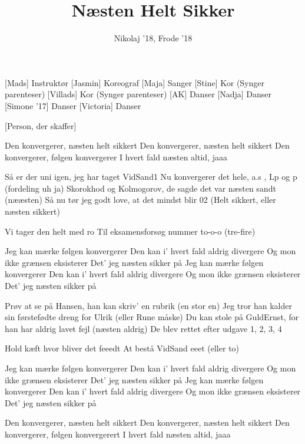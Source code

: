 \documentclass[a4paper,11pt]{article}
\title{Næsten Helt Sikker}
\author{Nikolaj '18, Frode '18}
\begin{document}
\maketitle

\begin{roles}
[Mads] Instruktør
[Jasmin] Koreograf
[Maja] Sanger
[Stine] Kor (Synger parenteser)
[Villads] Kor (Synger parenteser)
[AK] Danser
[Nadja] Danser
[Simone '17] Danser
[Victoria] Danser
\end{roles}

\begin{props}
[Person, der skaffer]
\end{props}


\begin{song}
%
Den konvergerer, næsten helt sikkert
Den konvergerer, næsten helt sikkert
Den konvergerer, følgen konvergerer
I hvert fald næsten altid, jaaa

%
Så er der uni igen, jeg har taget VidSand1
Nu konvergerer det hele, a.s , Lp og p (fordeling uh ja)
Skorokhod og Kolmogorov, de sagde det var næsten sandt
(nææsten)
Så nu tør jeg godt love, at det mindst blir 02
(Helt sikkert, eller næsten sikkert)

%
Vi tager den helt med ro
Til eksamensforsøg nummer to-o-o (tre-fire)

%
Jeg kan mærke følgen konvergerer
Den kan i' hvert fald aldrig divergere
Og mon ikke grænsen eksisterer
Det' jeg næsten sikker på
Jeg kan mærke følgen konvergerer
Den kan i' hvert fald aldrig divergere
Og mon ikke grænsen eksisterer
Det' jeg næsten sikker på

%
Prøv at se på Hansen, han kan skriv' en rubrik (en stor en)
Jeg tror han kalder sin førstefødte dreng for Ulrik
(eller Rune måske)
Du kan stole på GuldErnst, for han har aldrig lavet fejl
(næsten aldrig)
De blev rettet efter udgave 1, 2, 3, 4

%
Hold kæft hvor bliver det feeedt
At bestå VidSand eeet (eller to)

%
Jeg kan mærke følgen konvergerer
Den kan i' hvert fald aldrig divergere
Og mon ikke grænsen eksisterer
Det' jeg næsten sikker på
Jeg kan mærke følgen konvergerer
Den kan i' hvert fald aldrig divergere
Og mon ikke grænsen eksisterer
Det' jeg næsten sikker på

%
Den konvergerer, næsten helt sikkert
Den konvergerer, næsten helt sikkert
Den konvergerer, følgen konvergerert
I hvert fald næsten altid, jaaa


\end{song}
\end{document}
